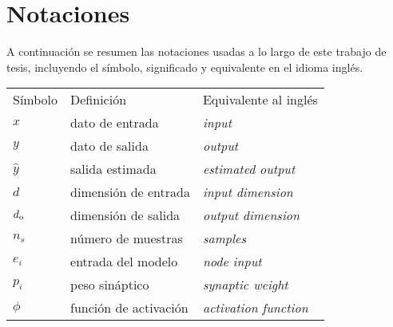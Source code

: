 \chapter{Notaciones}

A continuación se resumen las notaciones usadas a lo largo de este trabajo de tesis, incluyendo el símbolo,  significado y equivalente en el idioma inglés.


\begin{tabular} {l l l}
    Símbolo & Definición & Equivalente al inglés \\
    $x$ & dato de entrada & \emph{input} \\
    $y$ & dato de salida & \emph{output} \\
    $\hat{y}$ & salida estimada & \emph{estimated output} \\
    $d$ & dimensión de entrada & \emph{input dimension} \\
    $d_{\rm o}$ & dimensión de salida & \emph{output dimension} \\
    $n_s$ & número de muestras & \emph{samples} \\
    $e_i$ & entrada del modelo & \emph{node input} \\
    $p_i$ & peso sináptico & \emph{synaptic weight} \\
    $\phi$ & función de activación & \emph{activation function} \\
\end{tabular}


